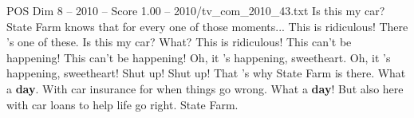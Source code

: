 \begin{textsample}{POS Dim 8 – 2010 – Score 1.00 – 2010/tv\_com\_2010\_43.txt}  \label{ex:f8_pos_053}
Is this my car?
State Farm knows that for every one of those moments...
This is ridiculous!
There 's one of these.
Is this my car?
What?
This is ridiculous!
This can't be happening!
This can't be happening!
Oh, it 's happening, sweetheart.
Oh, it 's happening, sweetheart!
Shut up!
Shut up!
That 's why State Farm is there.
What a \textbf{day}.
With car insurance for when things go wrong.
What a \textbf{day}!
But also here with car loans to help life go right.
State Farm.

\end{textsample}

